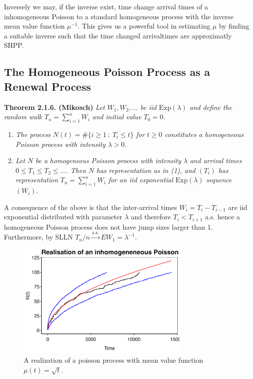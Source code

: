 \documentclass[a4paper,10pt,openany]{book}
\providecommand{\tightlist}{%
 \setlength{\itemsep}{0pt}\setlength{\parskip}{0pt}}
\begin{document}
Inversely we may, if the inverse exist, time change arrival times of a inhomogeneous Poisson to a standard homogeneous process with the inverse mean value function \(\mu^{-1}\). This gives us a powerful tool in estimating \(\mu\) by finding a suitable inverse such that the time changed arrivaltimes are approximatly SHPP.

\hypertarget{the-homogeneous-poisson-process-as-a-renewal-process}{%
\subsection{The Homogeneous Poisson Process as a Renewal Process}\label{the-homogeneous-poisson-process-as-a-renewal-process}}

\textbf{Theorem 2.1.6. (Mikosch)} \emph{Let \(W_1,W_2,...\) be iid \(\text{Exp}(\lambda)\) and define the random walk \(T_n=\sum_{i=1}^n W_i\) and initial value \(T_0=0\).}

\begin{enumerate}
\def\labelenumi{(\arabic{enumi})}
\tightlist
\item
  \emph{The process \(N(t)=\# \{i\ge 1\ :\ T_i\le t\}\) for \(t\ge 0\) constitutes a homogeneous Poisson process with intensity \(\lambda >0\).}
\item
  \emph{Let \(N\) be a homogeneous Poisson process with intensity \(\lambda\) and arrival times \(0 \le T_1 \le T_2 \le ...\). Then \(N\) has representation as in (1), and \((T_i)\) has representation \(T_n=\sum_{i=1}^n W_i\) for an iid exponential \(\text{Exp}(\lambda)\) sequence \((W_i)\).}
\end{enumerate}

A consequence of the above is that the inter-arrival times \(W_i=T_i-T_{i-1}\) are iid exponential distributed with parameter \(\lambda\) and therefore \(T_i<T_{i+1}\) a.s. hence a homogeneous Poisson process does not have jump sizes larger than 1. Furthermore, by SLLN \(T_n/n \stackrel{\text{a.s.}}{\to} E W_1=\lambda^{-1}\).

\begin{figure}[H]
  \begin{center}
    \includegraphics[width=0.75\textwidth]{figures/skade1_plot2.png}
  \end{center}
  \caption{A realization of a poisson process with mean value function $\mu(t)=\sqrt{t}$.}
\end{figure}
\end{document}
